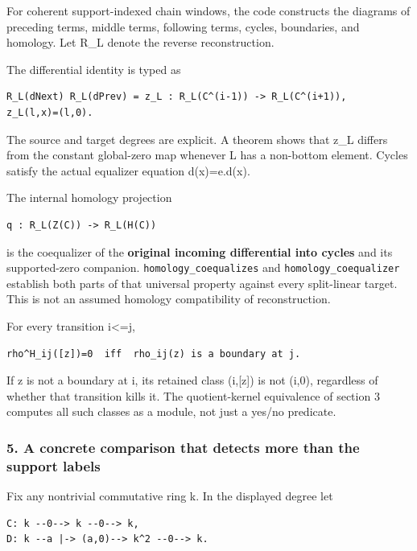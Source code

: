 For coherent support-indexed chain windows, the code constructs the diagrams of preceding terms,
middle terms, following terms, cycles, boundaries, and homology. Let R\_L denote the reverse
reconstruction.

The differential identity is typed as

\begin{verbatim}
R_L(dNext) R_L(dPrev) = z_L : R_L(C^(i-1)) -> R_L(C^(i+1)),
z_L(l,x)=(l,0).
\end{verbatim}

The source and target degrees are explicit. A theorem shows that z\_L differs from the constant
global-zero map whenever L has a non-bottom element. Cycles satisfy the actual equalizer equation
d(x)=e.d(x).

The internal homology projection

\begin{verbatim}
q : R_L(Z(C)) -> R_L(H(C))
\end{verbatim}

is the coequalizer of the \textbf{original incoming differential into cycles} and its supported-zero
companion. \nolinkurl{homology_coequalizes} and \nolinkurl{homology_coequalizer} establish both parts of
that universal property against every split-linear target. This is not an assumed homology
compatibility of reconstruction.

For every transition i\textless=j,

\begin{verbatim}
rho^H_ij([z])=0  iff  rho_ij(z) is a boundary at j.
\end{verbatim}

If z is not a boundary at i, its retained class (i,{[}z{]}) is not (i,0), regardless of whether that
transition kills it. The quotient-kernel equivalence of section 3 computes all such classes as a
module, not just a yes/no predicate.

\subsubsection{5. A concrete comparison that detects more than the support
labels}\label{derived_main:a-concrete-comparison-that-detects-more-than-the-support-labels}

Fix any nontrivial commutative ring k. In the displayed degree let

\begin{verbatim}
C: k --0--> k --0--> k,
D: k --a |-> (a,0)--> k^2 --0--> k.
\end{verbatim}


